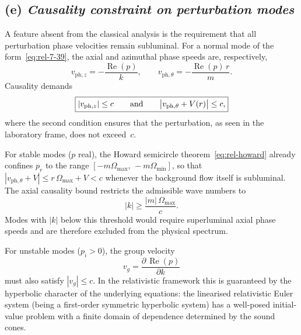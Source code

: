 \subsection*{(e) \emph{Causality constraint on perturbation modes}}
\label{sec:rel-7-67e}

A feature absent from the classical analysis is the requirement that
all perturbation phase velocities remain subluminal.  For a normal
mode of the form~\eqref{eq:rel-7-39}, the axial and azimuthal phase
speeds are, respectively,
\begin{equation}
\label{eq:rel-7-phase}
v_{\mathrm{ph},z} = -\frac{\operatorname{Re}(p)}{k},\qquad
v_{\mathrm{ph},\theta}
  = -\frac{\operatorname{Re}(p)\,r}{m}.
\end{equation}
Causality demands
\begin{equation}
\label{eq:rel-7-causality}
\boxed{%
|v_{\mathrm{ph},z}|\le c
\qquad\text{and}\qquad
\bigl|v_{\mathrm{ph},\theta}+V(r)\bigr|\le c,}
\end{equation}
where the second condition ensures that the perturbation, as seen in
the laboratory frame, does not exceed~$c$.

For stable modes ($p$ real), the Howard semicircle
theorem~\eqref{eq:rel-howard} already confines $p_r$ to the range
$[-m\Omega_{\max},\,-m\Omega_{\min}]$, so that
$|v_{\mathrm{ph},\theta}+V|\le r\,\Omega_{\max}+V<c$ whenever the
background flow itself is subluminal.  The axial causality bound
restricts the admissible wave numbers to
\begin{equation}
\label{eq:rel-7-kbound}
|k| \ge \frac{|m|\,\Omega_{\max}}{c}.
\end{equation}
Modes with $|k|$ below this threshold would require superluminal
axial phase speeds and are therefore excluded from the physical
spectrum.

For unstable modes ($p_i>0$), the group velocity
\begin{equation}
\label{eq:rel-7-group}
v_g = \frac{\partial\,\operatorname{Re}(p)}{\partial k}
\end{equation}
must also satisfy $|v_g|\le c$.  In the relativistic framework this is
guaranteed by the hyperbolic character of the underlying equations:
the linearised relativistic Euler system (being a first-order symmetric
hyperbolic system) has a well-posed initial-value problem with a finite
domain of dependence determined by the sound cones.

